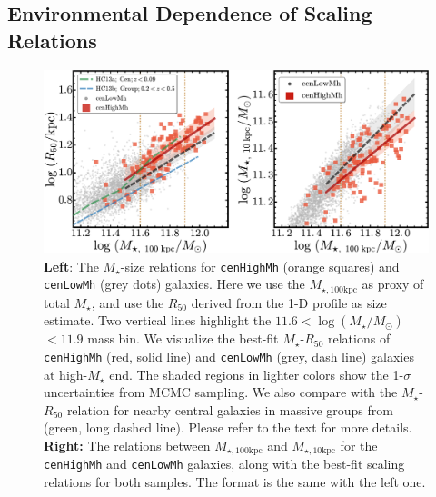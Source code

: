 \documentclass{emulateapj}
\def\rbcg{\texttt{cenHighMh}}
\def\nbcg{\texttt{cenLowMh}}
\def\mstar{{$M_{\star}$}}
\def\logms{{$\log (M_{\star}/M_{\odot})$}}
\def\minn{{$M_{\star,10\mathrm{kpc}}$}}
\def\mtot{{$M_{\star,100\mathrm{kpc}}$}}
\begin{document}
\begin{CJK*}{UTF8}{gbsn}

\subsection{Environmental Dependence of Scaling Relations}
    \label{ssec:scaling}

  \begin{figure}[bt!]
      \centering 
      \includegraphics[width=\textwidth]{fig/redbcg_scaling_relation}
      \caption{
          \textbf{Left}: The \mstar{}-size relations for \rbcg{} 
          (orange squares) and \nbcg{} (grey dots) galaxies. 
          Here we use the \mtot{} as proxy of total \mstar{}, and use the 
          $R_{\mathrm{50}}$ derived from the 1-D profile as size estimate. 
          Two vertical lines highlight the $11.6<$\logms{}$<11.9$ mass bin.
          We visualize the best-fit \mstar{}-$R_{\mathrm{50}}$ relations of \rbcg{} 
          (red, solid line) and \nbcg{} (grey, dash line) galaxies at high-\mstar{} end.
          The shaded regions in lighter colors show the 1-$\sigma$ uncertainties
          from MCMC sampling. 
          We also compare with the \mstar{}-$R_{\mathrm{50}}$ relation for nearby central 
          galaxies in massive groups from \citet{HCompany13} (green, long dashed line). 
          Please refer to the text for more details.~
          \textbf{Right:} The relations between \mtot{} and \minn{} for the 
          \rbcg{} and \nbcg{} galaxies, along with the best-fit scaling relations for 
          both samples.  The format is the same with the left one.
          }
      \label{fig:scaling_relation} 
  \end{figure}


\end{CJK*}
\end{document}
